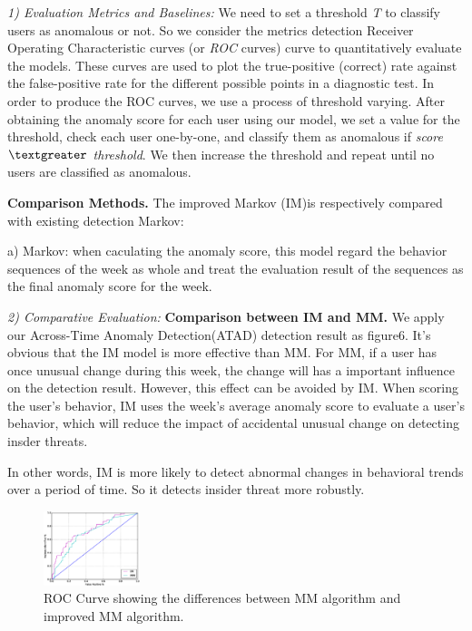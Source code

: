 \documentclass[conference]{IEEEtran}
\begin{document}
\emph{1) Evaluation Metrics and Baselines:}
We need to set a
threshold \emph{T} to classify users as anomalous or not. 
So we consider the metrics detection Receiver
Operating Characteristic curves (or \emph{ROC} curves) curve to quantitatively evaluate the models. These curves are used to plot the true-positive (correct) rate against the false-positive rate for the different possible points in a diagnostic test. In order to produce the ROC curves, we use a process of threshold varying. After obtaining the anomaly score for each user using our model, we set a value for
the threshold, check each user one-by-one, and
classify them as anomalous if \emph{score $\textgreater$ threshold}.
We then increase the threshold and repeat until no users are classified as anomalous.

\textbf{Comparison Methods.}
The improved Markov (IM)is respectively compared with existing detection Markov:

a) Markov: when caculating the anomaly score, this model regard the behavior sequences of the week as whole and treat the evaluation result of the sequences as the final anomaly score for the week.

\emph{2) Comparative Evaluation:} 
\textbf{Comparison between IM and MM.}
We apply our Across-Time Anomaly Detection(ATAD) detection result as figure6. It's obvious that the IM model is more effective than MM. For MM, if a user has once unusual change during this week, the change will has a important influence on the detection result. However, this effect can be avoided by IM. When scoring the user's behavior, IM uses the week's average anomaly score to evaluate a user's behavior, which will reduce the impact of accidental unusual change on detecting insder threats.

In other words, IM is more likely to detect abnormal changes in behavioral trends over a period of time. So it detects insider threat more robustly. 



\begin{figure}[htb]
\centerline{\includegraphics[width = 0.25\textwidth]{figure/figure7.eps}}
\caption{ROC Curve showing the differences between MM algorithm and improved MM algorithm.}
\label{fig}
\end{figure}
\end{document}
